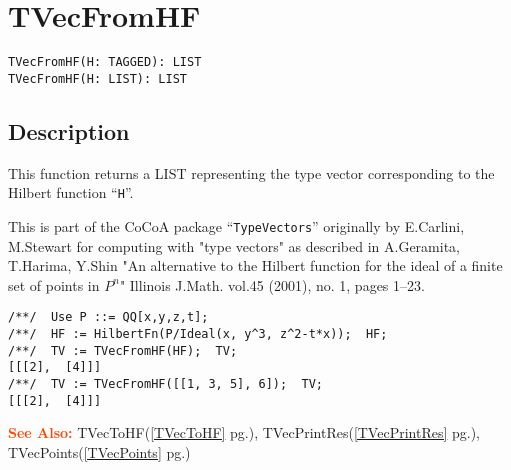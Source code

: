 \documentclass[a4paper]{mybook}
\newenvironment{command}{}{} %
\newcommand\SeeAlso{\par\textcolor{OrangeRed}{\textbf{\large See Also: }}}
\begin{document}
\section{TVecFromHF}
\label{TVecFromHF}
\begin{command} %


\begin{Verbatim}[label=syntax, rulecolor=\color{MidnightBlue},
frame=single]
TVecFromHF(H: TAGGED): LIST
TVecFromHF(H: LIST): LIST
\end{Verbatim}


\subsection*{Description}

This function returns a LIST representing the type vector corresponding
to the Hilbert function ``\verb&H&''.
\par 
This is part of the CoCoA package ``\verb&TypeVectors&''
originally by E.Carlini, M.Stewart
for computing with "type vectors" as described in
  A.Geramita, T.Harima, Y.Shin
"An alternative to the Hilbert function
 for the ideal of a finite set of points in $P^n$"
Illinois J.Math. vol.45 (2001), no. 1, pages 1--23.
\begin{Verbatim}[label=example, rulecolor=\color{PineGreen}, frame=single]
/**/  Use P ::= QQ[x,y,z,t];
/**/  HF := HilbertFn(P/Ideal(x, y^3, z^2-t*x));  HF;
/**/  TV := TVecFromHF(HF);  TV;
[[[2],  [4]]]
/**/  TV := TVecFromHF([[1, 3, 5], 6]);  TV;
[[[2],  [4]]]
\end{Verbatim}


\SeeAlso %
  TVecToHF(\ref{TVecToHF} pg.\pageref{TVecToHF}), 
    TVecPrintRes(\ref{TVecPrintRes} pg.\pageref{TVecPrintRes}), 
    TVecPoints(\ref{TVecPoints} pg.\pageref{TVecPoints})
\end{command} %
\end{document}
